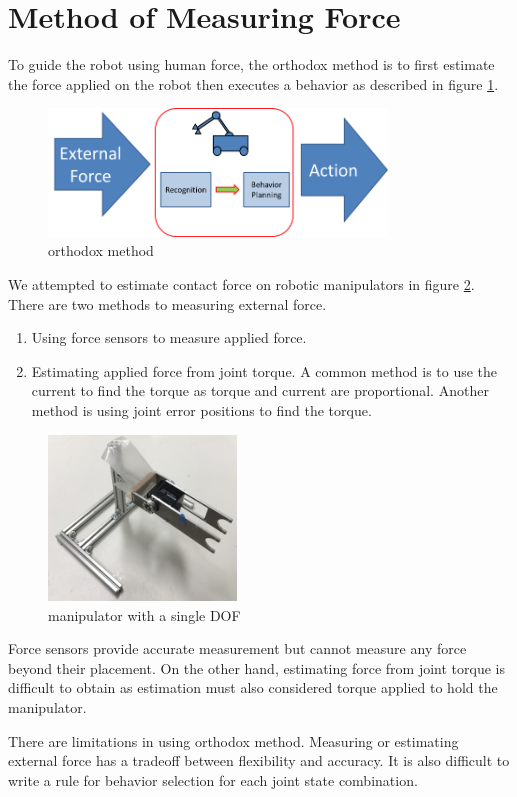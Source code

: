\section{Method of Measuring Force}
To guide the robot using human force, the orthodox method is to first estimate the force applied on the robot then executes a behavior as described in figure \ref{fig:orthodox}.

\begin{figure}[!htbp]
\begin{center}
\includegraphics[width=9cm]{orthodox_method.png}
\caption{orthodox method}
\label{fig:orthodox}
\end{center}
\end{figure}

We attempted to estimate contact force on robotic manipulators in figure \ref{fig:manipulator}. There are two methods to measuring external force. 

\begin{enumerate}
\item Using force sensors to measure applied force.
\item Estimating applied force from joint torque. A common method is to use the current to find the torque as torque and current are proportional. Another method is using joint error positions to find the torque.
\end{enumerate}

\begin{figure}[!htbp]
\begin{center}
\includegraphics[width=5cm]{manipulator.jpg}
\caption{manipulator with a single DOF}
\label{fig:manipulator}
\end{center}
\end{figure}

Force sensors provide accurate measurement but cannot measure any force beyond their placement. On the other hand, estimating force from joint torque is difficult to obtain as estimation must also considered torque applied to hold the manipulator. 

There are limitations in using orthodox method. Measuring or estimating external force has a tradeoff between flexibility and accuracy. It is also difficult to write a rule for behavior selection for each joint state combination.
